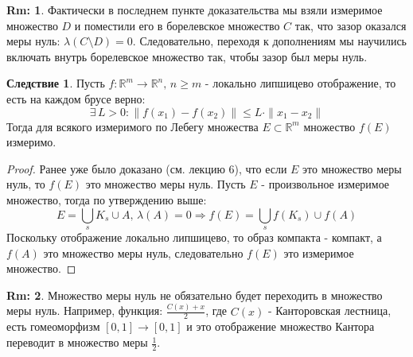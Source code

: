\documentclass[12pt]{article}
\newcommand{\MR}{\mathbb{R}}
\theoremstyle{definition}
\newtheorem{rem}{Rm:}
\newtheorem{corollary}{Следствие}
\begin{document}
\begin{rem}
	Фактически в последнем пункте доказательства мы взяли измеримое множество $D$ и поместили его в борелевское множество $C$ так, что зазор оказался меры нуль: $\lambda(C \setminus D) = 0$. Следовательно, переходя к дополнениям мы научились включать внутрь борелевское множество так, чтобы зазор был меры нуль.
\end{rem}

\begin{corollary}
	Пусть $f \colon \MR^m \to \MR^n, \, n \geq m$ - локально липшицево отображение, то есть на каждом брусе верно: 
	$$
		\exists \, L > 0 \colon \|f(x_1) - f(x_2)\| \leq L{\cdot}\|x_1 - x_2\|
	$$
	Тогда для всякого измеримого по Лебегу множества $E \subset \MR^m$ множество $f(E)$ измеримо.
\end{corollary}
\begin{proof}
	Ранее уже было доказано (см. лекцию $6$), что если $E$ это множество меры нуль, то $f(E)$ это множество меры нуль. Пусть $E$ - произвольное измеримое множество, тогда по утверждению выше:
	$$
		E = \bigcup\limits_s K_s \cup A, \, \lambda(A) = 0 \Rightarrow f(E) = \bigcup\limits_s f(K_s) \cup f(A)
	$$
	Поскольку отображение локально липшицево, то образ компакта - компакт, а $f(A)$ это множество меры нуль, следовательно $f(E)$ это измеримое множество.
\end{proof}
\begin{rem}
	Множество меры нуль не обязательно будет переходить в множество меры нуль. Например, функция: $\tfrac{C(x) + x}{2}$, где $C(x)$ - Канторовская лестница, есть гомеоморфизм $[0,1] \to [0,1]$ и это отображение множество Кантора переводит в множество меры $\tfrac{1}{2}$.
\end{rem}
\end{document}
